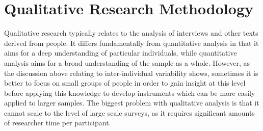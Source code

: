 


\section{Qualitative Research Methodology}

Qualitative research typically relates to the analysis of interviews and other texts derived from people. It differs fundamentally from quantitative analysis in that it aims for a deep understanding of particular individuals, while quantitative analysis aims for a broad understanding of the sample as a whole. However, as the discussion above relating to inter-individual variability shows, sometimes it is better to focus on small groups of people in order to gain insight at this level before applying this knowledge to develop instruments which can be more easily applied to larger samples. The biggest problem with qualitative analysis is that it cannot scale to the level of large scale surveys, as it requires significant amounts of researcher time per participant. %

